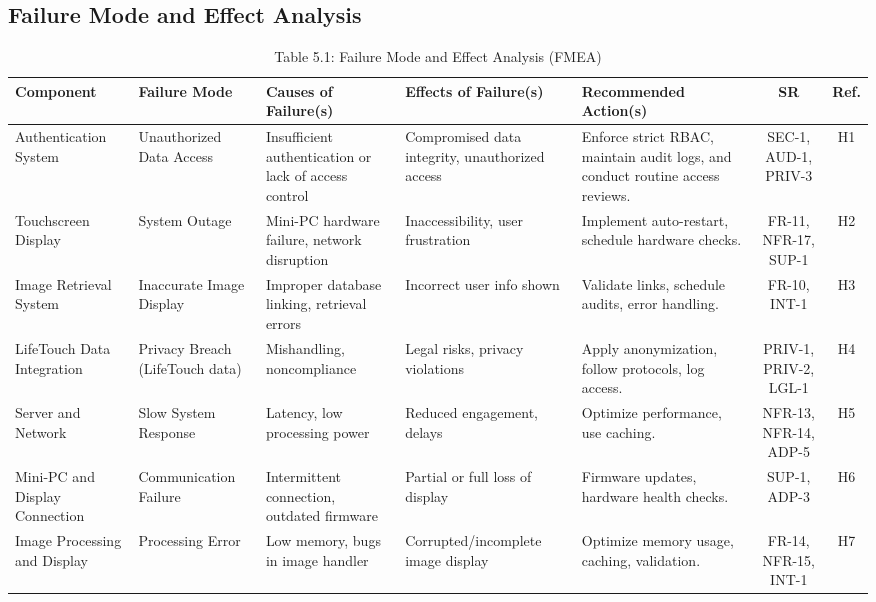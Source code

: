 \documentclass{article}
\begin{document}
\begin{landscape}
\section{Failure Mode and Effect Analysis}
\begin{table}[H]
\centering
\caption{Table 5.1: Failure Mode and Effect Analysis (FMEA)}
\renewcommand{\arraystretch}{1}
\begin{adjustbox}{max width=\linewidth}
\begin{tabular}{|p{4cm}|p{3.8cm}|p{4cm}|p{4cm}|p{6cm}|c|c|}
\hline
\textbf{Component} & \textbf{Failure Mode} & \textbf{Causes of Failure(s)} & \textbf{Effects of Failure(s)} & \textbf{Recommended Action(s)} & \textbf{SR} & \textbf{Ref.} \\
\hline
Authentication System & Unauthorized Data Access & Insufficient authentication or lack of access control & Compromised data integrity, unauthorized access & Enforce strict RBAC, maintain audit logs, and conduct routine access reviews. & SEC-1, AUD-1, PRIV-3 & H1 \\
\hline
Touchscreen Display & System Outage & Mini-PC hardware failure, network disruption & Inaccessibility, user frustration & Implement auto-restart, schedule hardware checks. & FR-11, NFR-17, SUP-1 & H2 \\
\hline
Image Retrieval System & Inaccurate Image Display & Improper database linking, retrieval errors & Incorrect user info shown & Validate links, schedule audits, error handling. & FR-10, INT-1 & H3 \\
\hline
LifeTouch Data Integration & Privacy Breach (LifeTouch data) & Mishandling, noncompliance & Legal risks, privacy violations & Apply anonymization, follow protocols, log access. & PRIV-1, PRIV-2, LGL-1 & H4 \\
\hline
Server and Network & Slow System Response & Latency, low processing power & Reduced engagement, delays & Optimize performance, use caching. & NFR-13, NFR-14, ADP-5 & H5 \\
\hline
Mini-PC and Display Connection & Communication Failure & Intermittent connection, outdated firmware & Partial or full loss of display & Firmware updates, hardware health checks. & SUP-1, ADP-3 & H6 \\
\hline
Image Processing and Display & Processing Error & Low memory, bugs in image handler & Corrupted/incomplete image display & Optimize memory usage, caching, validation. & FR-14, NFR-15, INT-1 & H7 \\

\end{tabular}
\end{adjustbox}
\end{table}
\end{landscape}
\end{document}

